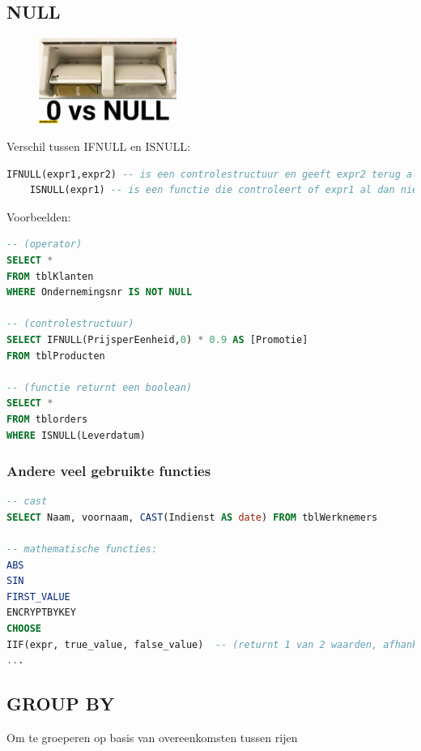 \documentclass{article}
\begin{document}
\subsection{NULL}
\begin{figure}[H]
    \centering
    \includegraphics[width=0.4\textwidth]{null.jpg}
    \caption{}
\end{figure}
Verschil tussen IFNULL en ISNULL:
\begin{lstlisting}[language=SQL]
    IFNULL(expr1,expr2) -- is een controlestructuur en geeft expr2 terug als de waarde van expr1 NULL is.
    ISNULL(expr1) -- is een functie die controleert of expr1 al dan niet NULL is en dan 0 teruggeeft. In het andere geval wordt 1 teruggegeven. Dit kan handig gebruikt worden wanneer je een NULL wil omzetten naar 0 om bijvoorbeeld te kunnen sorteren.
\end{lstlisting}
\newpage
Voorbeelden:
\begin{lstlisting}[language=SQL]
-- (operator)
SELECT * 
FROM tblKlanten 
WHERE Ondernemingsnr IS NOT NULL       

-- (controlestructuur)
SELECT IFNULL(PrijsperEenheid,0) * 0.9 AS [Promotie]
FROM tblProducten 

-- (functie returnt een boolean)
SELECT * 
FROM tblorders
WHERE ISNULL(Leverdatum)
\end{lstlisting}

\subsubsection{Andere veel gebruikte functies}

\begin{lstlisting}[language=SQL]
-- cast
SELECT Naam, voornaam, CAST(Indienst AS date) FROM tblWerknemers

-- mathematische functies:
ABS
SIN
FIRST_VALUE
ENCRYPTBYKEY
CHOOSE
IIF(expr, true_value, false_value)  -- (returnt 1 van 2 waarden, afhankelijk van de boolean expression)
...
\end{lstlisting}


\subsection{GROUP BY}
Om te groeperen op basis van overeenkomsten tussen rijen
\end{document}
